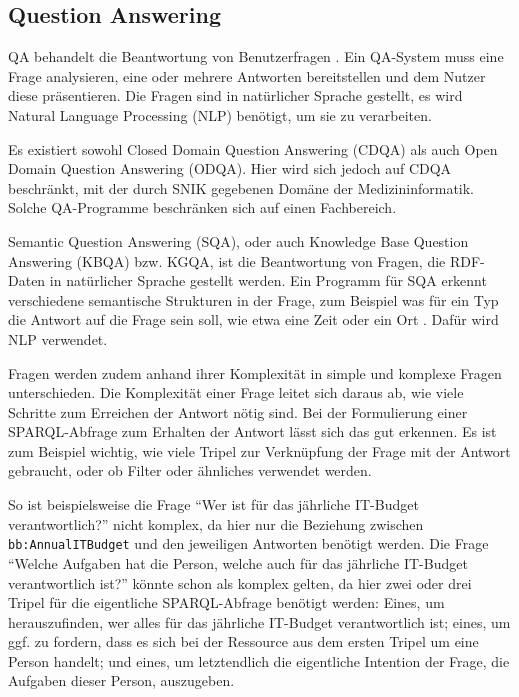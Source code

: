 \documentclass[utf8,biblatex]{lni}
\begin{document}
\subsection{Question Answering}

QA behandelt die Beantwortung von Benutzerfragen \citep{qadefinition}.
Ein QA-System muss eine Frage analysieren, eine oder mehrere Antworten bereitstellen und dem Nutzer diese präsentieren.
Die Fragen sind in natürlicher Sprache gestellt, es wird Natural Language Processing (NLP) benötigt, um sie zu verarbeiten.

Es existiert sowohl Closed Domain Question Answering (CDQA) als auch Open Domain Question Answering (ODQA).
Hier wird sich jedoch auf CDQA beschränkt, mit der durch SNIK gegebenen Domäne der Medizininformatik.
Solche QA-Programme beschränken sich auf einen Fachbereich.

Semantic Question Answering (SQA), oder auch Knowledge Base Question Answering (KBQA) bzw. KGQA, ist die Beantwortung von Fragen, die RDF-Daten in natürlicher Sprache gestellt werden.
Ein Programm für SQA erkennt verschiedene semantische Strukturen in der Frage,
zum Beispiel was für ein Typ die Antwort auf die Frage sein soll, wie etwa eine Zeit oder ein Ort \citep{sqadefinition}.
Dafür wird NLP verwendet.

Fragen werden zudem anhand ihrer Komplexität in simple und komplexe Fragen unterschieden.
Die Komplexität einer Frage leitet sich daraus ab, wie viele Schritte zum Erreichen der Antwort nötig sind.
Bei der Formulierung einer SPARQL-Abfrage zum Erhalten der Antwort lässt sich das gut erkennen.
Es ist zum Beispiel wichtig, wie viele Tripel zur Verknüpfung der Frage mit der Antwort gebraucht, oder ob Filter oder ähnliches verwendet werden.

So ist beispielsweise die Frage \enquote{Wer ist für das jährliche IT-Budget verantwortlich?} nicht komplex,
da hier nur die Beziehung zwischen \texttt{bb:AnnualITBudget} und den jeweiligen Antworten benötigt werden.
Die Frage \enquote{Welche Aufgaben hat die Person, welche auch für das jährliche IT-Budget verantwortlich ist?} könnte schon als komplex gelten,
da hier zwei oder drei Tripel für die eigentliche SPARQL-Abfrage benötigt werden:
Eines, um herauszufinden, wer alles für das jährliche IT-Budget verantwortlich ist;
eines, um ggf. zu fordern, dass es sich bei der Ressource aus dem ersten Tripel um eine Person handelt;
und eines, um letztendlich die eigentliche Intention der Frage, die Aufgaben dieser Person, auszugeben.
\end{document}
